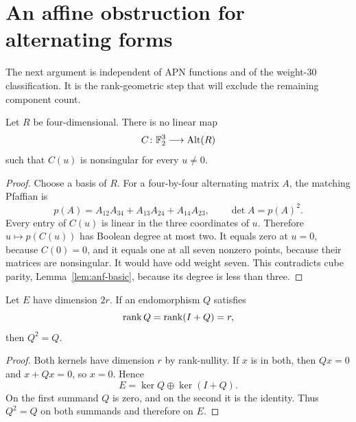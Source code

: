 \section{An affine obstruction for alternating forms}\label{sec:obstruction}
The next argument is independent of APN functions and of the weight-$30$ classification. It is the rank-geometric step that will exclude the remaining component count.

\begin{lemma}\label{lem:no-three-pencil}
Let $R$ be four-dimensional. There is no linear map
\[
C\colon\mathbb F_2^3\longrightarrow\operatorname{Alt}(R)
\]
such that $C(u)$ is nonsingular for every $u\ne0$.
\end{lemma}
\begin{proof}
Choose a basis of $R$. For a four-by-four alternating matrix $A$, the matching Pfaffian is
\[
p(A)=A_{12}A_{34}+A_{13}A_{24}+A_{14}A_{23},
\qquad \det A=p(A)^2.
\]
Every entry of $C(u)$ is linear in the three coordinates of $u$. Therefore $u\mapsto p(C(u))$ has Boolean degree at most two. It equals zero at $u=0$, because $C(0)=0$, and it equals one at all seven nonzero points, because their matrices are nonsingular. It would have odd weight seven. This contradicts cube parity, Lemma~\ref{lem:anf-basic}, because its degree is less than three.
\end{proof}

\begin{lemma}\label{lem:half-rank}
Let $E$ have dimension $2r$. If an endomorphism $Q$ satisfies
\[
\operatorname{rank} Q=\operatorname{rank}(I+Q)=r,
\]
then $Q^2=Q$.
\end{lemma}
\begin{proof}
Both kernels have dimension $r$ by rank-nullity. If $x$ is in both, then $Qx=0$ and $x+Qx=0$, so $x=0$. Hence
\[
E=\ker Q\oplus\ker(I+Q).
\]
On the first summand $Q$ is zero, and on the second it is the identity. Thus $Q^2=Q$ on both summands and therefore on $E$.
\end{proof}

